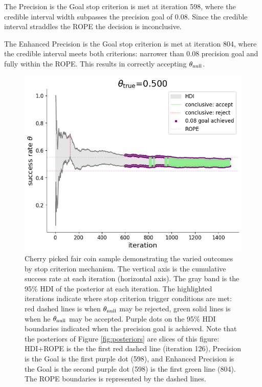 \documentclass{article}
\begin{document}
The Precision is the Goal stop criterion is met at iteration 598, where the credible
interval width
subpasses the precision goal of 0.08. Since the credible interval straddles the ROPE
the decision is inconclusive.

The Enhanced Precision is the Goal stop criterion is met at iteration 804, where the credible interval
meets both criterions: narrower than 0.08 precision goal and fully within the ROPE.
This results in correctly accepting $\theta_{\rm null}$.

\begin{figure}[h!]
  \centering
  \includegraphics[width=1\textwidth]{cherry_iterations.png}
  \caption{Cherry picked fair coin sample demonstrating the varied outcomes by
  stop criterion mechanism. The vertical axis is the cumulative success rate
  at each iteration (horizontal axis).
  The gray band is the 95\% HDI of the posterior at each iteration.
  The highlighted iterations indicate where stop criterion trigger conditions are met:
  red dashed lines is when  $\theta_{\rm null}$ may be rejected, green solid lines
  is when he $\theta_{\rm null}$ may be accepted. Purple dots on the 95\% HDI boundaries
  indicated when the precision goal is achieved. Note that the posteriors of Figure \ref{fig:posteriors}
  are slices of this figure: HDI+ROPE is the the first red dashed line (iteration 126),
  Precision is the Goal is the first purple dot (598), and Enhanced Precision is the Goal is the second purple dot (598)
  is the first green line (804). The ROPE boundaries is represented by the dashed lines.
  }
  \label{fig:iterations}
\end{figure}
\end{document}
